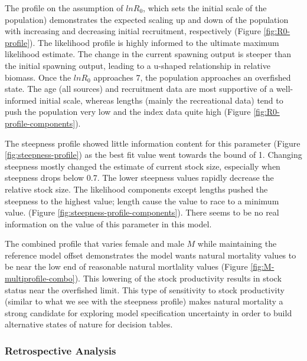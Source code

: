 \documentclass[11pt,
  english,
  letterpaper,
]{article}
\begin{document}
The profile on the assumption of \(lnR_0\), which sets the initial scale of the population) demonstrates the expected scaling up and down of the population with increasing and decreasing initial recruitment, respectively (Figure \ref{fig:R0-profile}). The likelihood profile is highly informed to the ultimate maximum likelihood estimate. The change in the current spawning output is steeper than the initial spawning output, leading to a u-shaped relationship in relative biomass. Once the \(lnR_0\) approaches 7, the population approaches an overfished state. The age (all sources) and recruitment data are most supportive of a well-informed initial scale, whereas lengths (mainly the recreational data) tend to push the population very low and the index data quite high (Figure \ref{fig:R0-profile-components}).

The steepness profile showed little information content for this parameter (Figure \ref{fig:steepness-profile}) as the best fit value went towards the bound of 1. Changing steepness mostly changed the estimate of current stock size, especially when steepness drops below 0.7. The lower steepness values rapidly decrease the relative stock size. The likelihood components except lengths pushed the steepness to the highest value; length cause the value to race to a minimum value. (Figure \ref{fig:steepness-profile-components}). There seems to be no real information on the value of this parameter in this model.

The combined profile that varies female and male \(M\) while maintaining the reference model offset demonstrates the model wants natural mortality values to be near the low end of reasonable natural mortlality values (Figure \ref{fig:M-multiprofile-combo}). This lowering of the stock productivity results in stock status near the overfished limit. This type of sensitivity to stock productivity (similar to what we see with the steepness profile) makes natural mortality a strong candidate for exploring model specification uncertainty in order to build alternative states of nature for decision tables.

\hypertarget{retrospective-analysis}{%
\subsubsection{Retrospective Analysis}\label{retrospective-analysis}}
\end{document}
